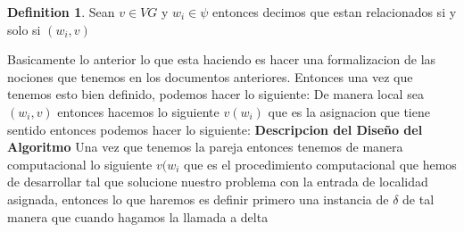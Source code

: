 \documentclass[11pt]{article}
\theoremstyle{definition}
\newtheorem{definition}{Definition}[section]
\begin{document}
    \begin{definition}
        Sean $v\in VG$ y $w_{i} \in \psi$ entonces decimos que estan relacionados
        si y solo si $(w_{i}, v)$
    \end{definition}
    \newline
    Basicamente lo anterior lo que esta haciendo es hacer una formalizacion de las nociones
    que tenemos en los documentos anteriores.
    \newpage
    Entonces una vez que tenemos esto bien definido, podemos hacer lo siguiente:
    De manera local sea $(w_{i},v)$ entonces hacemos lo siguiente $v(w_{i})$ que es la asignacion que tiene
    sentido entonces podemos hacer lo siguiente:
    \textbf{Descripcion del Diseño del Algoritmo}
    Una vez que tenemos la pareja entonces tenemos de manera computacional lo siguiente $v(w_{i}$ que es el
    procedimiento computacional que hemos de desarrollar tal que solucione nuestro problema con la entrada
    de localidad asignada, entonces lo que haremos es definir primero una instancia de $\delta$ de tal manera
    que cuando hagamos la llamada a delta 
\end{document}
